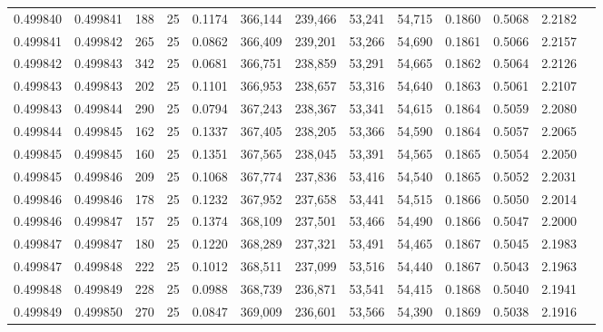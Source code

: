 \begin{tabular}{rrrrrrrrrrrrr}
0.499840 & 0.499841 & 188 &  25 &                                     0.1174 & 366,144 & 239,466 &  53,241 &  54,715 & 0.1860 & 0.5068 & 2.2182 \\
0.499841 & 0.499842 & 265 &  25 &                                     0.0862 & 366,409 & 239,201 &  53,266 &  54,690 & 0.1861 & 0.5066 & 2.2157 \\
0.499842 & 0.499843 & 342 &  25 &                                     0.0681 & 366,751 & 238,859 &  53,291 &  54,665 & 0.1862 & 0.5064 & 2.2126 \\
0.499843 & 0.499843 & 202 &  25 &                                     0.1101 & 366,953 & 238,657 &  53,316 &  54,640 & 0.1863 & 0.5061 & 2.2107 \\
0.499843 & 0.499844 & 290 &  25 &                                     0.0794 & 367,243 & 238,367 &  53,341 &  54,615 & 0.1864 & 0.5059 & 2.2080 \\
0.499844 & 0.499845 & 162 &  25 &                                     0.1337 & 367,405 & 238,205 &  53,366 &  54,590 & 0.1864 & 0.5057 & 2.2065 \\
0.499845 & 0.499845 & 160 &  25 &                                     0.1351 & 367,565 & 238,045 &  53,391 &  54,565 & 0.1865 & 0.5054 & 2.2050 \\
0.499845 & 0.499846 & 209 &  25 &                                     0.1068 & 367,774 & 237,836 &  53,416 &  54,540 & 0.1865 & 0.5052 & 2.2031 \\
0.499846 & 0.499846 & 178 &  25 &                                     0.1232 & 367,952 & 237,658 &  53,441 &  54,515 & 0.1866 & 0.5050 & 2.2014 \\
0.499846 & 0.499847 & 157 &  25 &                                     0.1374 & 368,109 & 237,501 &  53,466 &  54,490 & 0.1866 & 0.5047 & 2.2000 \\
0.499847 & 0.499847 & 180 &  25 &                                     0.1220 & 368,289 & 237,321 &  53,491 &  54,465 & 0.1867 & 0.5045 & 2.1983 \\
0.499847 & 0.499848 & 222 &  25 &                                     0.1012 & 368,511 & 237,099 &  53,516 &  54,440 & 0.1867 & 0.5043 & 2.1963 \\
0.499848 & 0.499849 & 228 &  25 &                                     0.0988 & 368,739 & 236,871 &  53,541 &  54,415 & 0.1868 & 0.5040 & 2.1941 \\
0.499849 & 0.499850 & 270 &  25 &                                     0.0847 & 369,009 & 236,601 &  53,566 &  54,390 & 0.1869 & 0.5038 & 2.1916 \\

\end{tabular}
